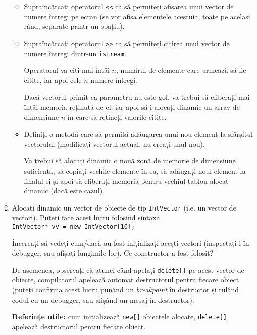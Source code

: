 \begin{enumerate}
\begin{itemize}
        \item Supraîncărcați operatorul \texttt{<<} ca să permiteți afișarea unui vector de numere întregi pe ecran (se vor afișa elementele acestuia, toate pe același rând, separate printr-un spațiu).

        \item Supraîncărcați operatorul \texttt{>>} ca să permiteți citirea unui vector de numere întregi dintr-un \texttt{istream}.
        
        Operatorul va citi mai întâi \(n\), numărul de elemente care urmează să fie citite, iar apoi cele \(n\) numere întregi.

        Dacă vectorul primit ca parametru nu este gol, va trebui să eliberați mai întâi memoria reținută de el, iar apoi să-i alocați dinamic un array de dimensiune \(n\) în care să rețineți valorile citite.
        
        \item Definiți o metodă care să permită adăugarea unui nou element la sfârșitul vectorului (modificați vectorul actual, nu creați unul nou).
        
        Va trebui să alocați dinamic o nouă zonă de memorie de dimensiune suficientă, să copiați vechile elemente în ea, să adăugați noul element la finalul ei și apoi să eliberați memoria pentru vechiul tablou alocat dinamic (dacă este cazul).
    \end{itemize}

    \item Alocați dinamic un vector de obiecte de tip \texttt{IntVector} (i.e. un vector de vectori). Puteți face acest lucru folosind sintaxa \\[0.5em]
    \texttt{IntVector* vv = new IntVector[10];}

    Încercați să vedeți cum/dacă au fost inițializați acești vectori (inspectați-i în debugger, sau afișați lungimile lor). Ce constructor a fost folosit?

    De asemenea, observați că atunci când apelați \texttt{delete[]} pe acest vector de obiecte, compilatorul apelează automat destructorul pentru fiecare obiect (puteți confirma acest lucru punând un \textit{breakpoint} în destructor și rulând codul cu un debugger, sau afișând un mesaj în destructor).

    \textbf{Referințe utile:} \href{https://stackoverflow.com/a/3575509/5723188}{cum inițializează \texttt{new[]} obiectele alocate}, \href{https://stackoverflow.com/a/17344873/5723188}{\texttt{delete[]} apelează destructorul pentru fiecare obiect}.


\end{enumerate}

